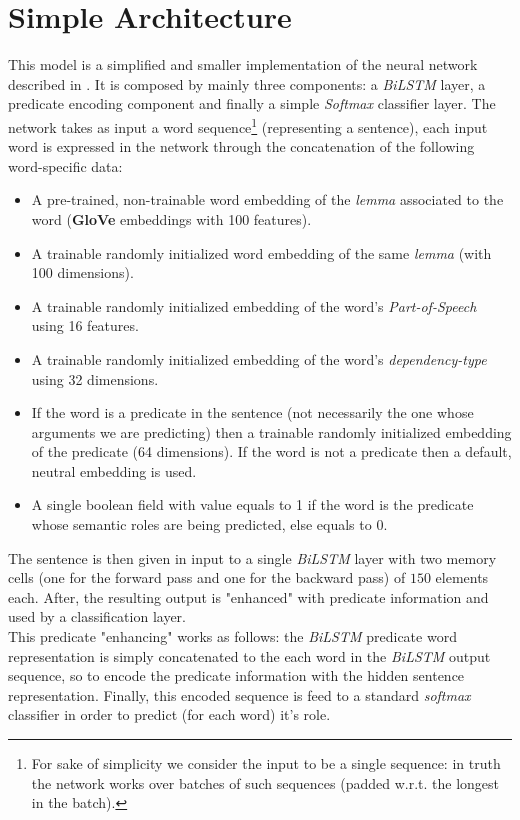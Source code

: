 \documentclass[a4paper,10pt,twocolumn]{article}
\newcommand{\BiLSTM}{\emph{BiLSTM}}
\newcommand{\CELLSIZE}{150}
\begin{document}
\section{Simple Architecture}
\label{sec:simple_arch}
This model is a simplified and smaller implementation of the neural network described in \cite{simple}. It is composed by mainly three components: a \BiLSTM{} layer, a predicate encoding component and finally a simple \emph{Softmax} classifier layer. The network takes as input a  word sequence\footnote{For sake of simplicity we consider the input to be a single sequence: in truth the network works over batches of such sequences (padded w.r.t. the longest in the batch).} (representing a  sentence), each input word is expressed in the network through the concatenation of the following word-specific data:
\begin{itemize}
\item A pre-trained, non-trainable word embedding of the \emph{lemma} associated to the word (\textbf{GloVe} embeddings with 100 features).
\item A trainable randomly initialized word embedding of the same \emph{lemma} (with 100 dimensions).
\item A trainable randomly initialized embedding of the word's \emph{Part-of-Speech} using 16 features.
\item A trainable randomly initialized embedding of the word's \emph{dependency-type} using 32 dimensions.
\item If the word is a predicate in the sentence (not necessarily the one whose arguments we are predicting) then a trainable randomly initialized embedding of the predicate (64 dimensions). If the word is not a predicate then a default,  neutral embedding is used.
\item A single boolean field with value equals to 1 if the word is the predicate whose semantic roles are being predicted, else equals to 0.
\end{itemize}
The sentence is then given in input to a single \BiLSTM{} layer with two memory cells (one for the forward pass and one for the backward pass) of $\CELLSIZE{}$ elements each. After, the resulting output is "enhanced" with predicate information  and used by a classification layer.\\This  predicate "enhancing"  works as follows: the \BiLSTM{} predicate word representation is simply concatenated to the each word in the \BiLSTM{} output sequence, so to encode the predicate information with the hidden sentence representation. Finally, this encoded sequence is feed to a standard \emph{softmax} classifier in order to predict (for each word) it's role. 
\end{document}
